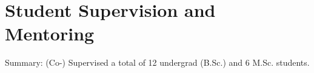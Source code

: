 \documentclass[11pt,a4paper,sans]{moderncv}        %
\begin{document}
\section{Student Supervision and Mentoring}
Summary: (Co-) Supervised a total of 12 undergrad (B.Sc.)  and 6 M.Sc. students.%
%
\end{document}

